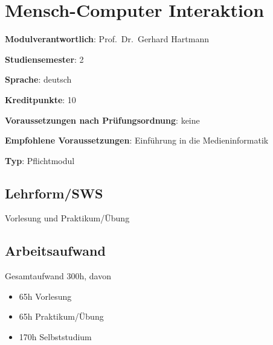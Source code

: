\chapter{Mensch-Computer
Interaktion\label{/mi-2017/modulbeschreibungen-bachelor/BA_Mensch-Computer_Interaktion}}\label{mensch-computer-interaktionpathlabelmi-2017modulbeschreibungen-bachelorbaux5fmensch-computerux5finteraktion}

\begin{modulHead}
\textbf{Modulverantwortlich}: Prof.~Dr.~Gerhard
Hartmann
\end{modulHead}
\begin{modulHead}
\textbf{Studiensemester}:
2
\end{modulHead}
\begin{modulHead}
\textbf{Sprache}:
deutsch
\end{modulHead}
\begin{modulHead}
\textbf{Kreditpunkte}:
10
\end{modulHead}
\begin{modulHead}
\textbf{Voraussetzungen nach
Prüfungsordnung}:
keine
\end{modulHead}
\begin{modulHead}
\textbf{Empfohlene
Voraussetzungen}: Einführung in die
Medieninformatik
\end{modulHead}
\begin{modulHead}
\textbf{Typ}:
Pflichtmodul
\end{modulHead}


\section*{Lehrform/SWS\label{/mi-2017/modulbeschreibungen-bachelor/BA_Mensch-Computer_Interaktion}}\label{lehrformswspathlabelmi-2017modulbeschreibungen-bachelorbaux5fmensch-computerux5finteraktion}

Vorlesung und Praktikum/Übung

\section*{Arbeitsaufwand\label{/mi-2017/modulbeschreibungen-bachelor/BA_Mensch-Computer_Interaktion}}\label{arbeitsaufwandpathlabelmi-2017modulbeschreibungen-bachelorbaux5fmensch-computerux5finteraktion}

Gesamtaufwand 300h, davon

\begin{itemize}
\tightlist
\item
  65h Vorlesung
\item
  65h Praktikum/Übung
\item
  170h Selbststudium
\end{itemize}


